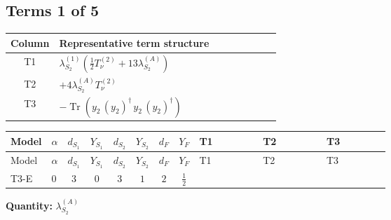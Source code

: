 \documentclass[8pt]{article}
\begin{document}
\begin{landscape}
\subsection*{Terms 1 of 5}
\begin{center}
\begin{tabular}{@{}c >{\raggedright\arraybackslash}p{0.82\linewidth}@{}}
\toprule
Column & Representative term structure \\
\midrule
T1 & \(\displaystyle {\lambda_{S_2}^{(1)}} \left(\frac{1}{2} T_{\nu}^{(2)}+13 {\lambda_{S_2}^{(A)}}\right)\) \\
\midrule
T2 & \(\displaystyle +4 {\lambda_{S_2}^{(A)}} T_{\nu}^{(2)}\) \\
\midrule
T3 & \(\displaystyle -\operatorname{Tr}\!\left({y_2}\,\left({y_2}\right)^{\dagger}\,{y_2}\,\left({y_2}\right)^{\dagger}\right)\) \\
\midrule
\bottomrule
\end{tabular}
\end{center}
\smallskip
\tiny
\begin{longtable}{@{}llcccccc >{\raggedright\arraybackslash}p{0.21\linewidth} >{\raggedright\arraybackslash}p{0.21\linewidth} >{\raggedright\arraybackslash}p{0.21\linewidth}@{}}
\toprule
Model & $\alpha$ & $d_{S_1}$ & $Y_{S_1}$ & $d_{S_2}$ & $Y_{S_2}$ & $d_F$ & $Y_F$ & T1 & T2 & T3 \\
\midrule
\endfirsthead
\toprule
Model & $\alpha$ & $d_{S_1}$ & $Y_{S_1}$ & $d_{S_2}$ & $Y_{S_2}$ & $d_F$ & $Y_F$ & T1 & T2 & T3 \\
\midrule
\endhead
T3-E & $0$ & $3$ & $0$ & $3$ & $1$ & $2$ & $\frac{1}{2}$ & \scriptsize\adjustbox{max width=\linewidth}{$\begin{gathered} {\lambda_{S_2}^{(1)}} \left(\frac{1}{2} T_{\nu}^{(2)}+13 {\lambda_{S_2}^{(A)}}\right)\end{gathered}$} & \scriptsize\adjustbox{max width=\linewidth}{$\begin{gathered} +4 {\lambda_{S_2}^{(A)}} T_{\nu}^{(2)}\end{gathered}$} & \scriptsize\adjustbox{max width=\linewidth}{$\begin{gathered} -\operatorname{Tr}\!\left({y_2}\,\left({y_2}\right)^{\dagger}\,{y_2}\,\left({y_2}\right)^{\dagger}\right)\end{gathered}$} \\
\midrule
\bottomrule
\end{longtable}
\clearpage
\noindent\textbf{Quantity: }$\lambda_{S_2}^{(A)}$\par\smallskip

\end{landscape}
\end{document}
